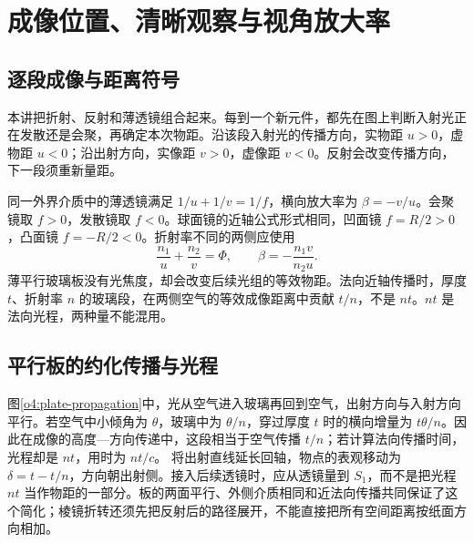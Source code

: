 \section{成像位置、清晰观察与视角放大率}

\subsection{逐段成像与距离符号}

本讲把折射、反射和薄透镜组合起来。每到一个新元件，都先在图上判断入射光正在发散还是会聚，再确定本次物距。沿该段入射光的传播方向，实物距 \(u>0\)，虚物距 \(u<0\)；沿出射方向，实像距 \(v>0\)，虚像距 \(v<0\)。反射会改变传播方向，下一段须重新量距。

同一外界介质中的薄透镜满足 \(1/u+1/v=1/f\)，横向放大率为 \(\beta=-v/u\)。会聚镜取 \(f>0\)，发散镜取 \(f<0\)。球面镜的近轴公式形式相同，凹面镜 \(f=R/2>0\)，凸面镜 \(f=-R/2<0\)。折射率不同的两侧应使用
\[
 \frac{n_1}{u}+\frac{n_2}{v}=\Phi,\qquad
 \beta=-\frac{n_1v}{n_2u}.
\]
薄平行玻璃板没有光焦度，却会改变后续光组的等效物距。法向近轴传播时，厚度 \(t\)、折射率 \(n\) 的玻璃段，在两侧空气的等效成像距离中贡献 \(t/n\)，不是 \(nt\)。\(nt\) 是法向光程，两种量不能混用。

\subsection{平行板的约化传播与光程}

图\ref{o4:plate-propagation}中，光从空气进入玻璃再回到空气，出射方向与入射方向平行。若空气中小倾角为 $\theta$，玻璃中为 $\theta/n$，穿过厚度 $t$ 时的横向增量为 $t\theta/n$。因此在成像的高度—方向传递中，这段相当于空气传播 $t/n$；若计算法向传播时间，光程却是 $nt$，用时为 $nt/c$。
将出射直线延长回轴，物点的表观移动为 $\delta=t-t/n$，方向朝出射侧。接入后续透镜时，应从透镜量到 $S_1$，而不是把光程 $nt$ 当作物距的一部分。板的两面平行、外侧介质相同和近法向传播共同保证了这个简化；棱镜折转还须先把反射后的路径展开，不能直接把所有空间距离按纸面方向相加。

